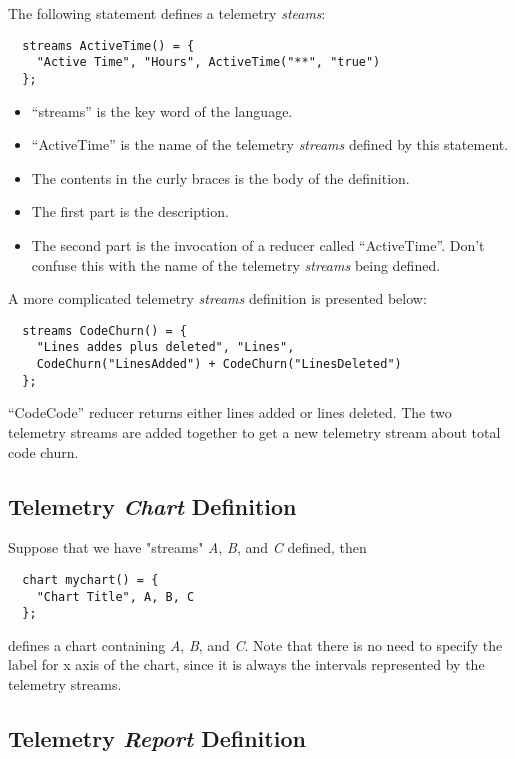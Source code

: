 The following statement defines a telemetry \textit{steams}:
\begin{verbatim}
  streams ActiveTime() = {
    "Active Time", "Hours", ActiveTime("**", "true")
  };
\end{verbatim}
\begin{itemize}
  \setlength{\itemsep}{0pt}
  \setlength{\parskip}{0pt}
	\item ``streams'' is the key word of the language.
  \item ``ActiveTime'' is the name of the telemetry \textit{streams} defined by this statement.
  \item The contents in the curly braces is the body of the definition.
  \item The first part is the description.
  \item The second part is the invocation of a reducer called ``ActiveTime''. Don't confuse  this with the name of the telemetry \textit{streams} being defined.
\end{itemize}
            

A more complicated telemetry \textit{streams} definition is presented below:
\begin{verbatim}
  streams CodeChurn() = { 
    "Lines addes plus deleted", "Lines",
    CodeChurn("LinesAdded") + CodeChurn("LinesDeleted")
  };
\end{verbatim}
``CodeCode'' reducer returns either lines added or lines deleted. The two telemetry streams are added together to get a new telemetry stream about total code churn.


        
                
\subsection{Telemetry \textit{Chart} Definition}

Suppose that we have "streams" \textit{A}, \textit{B}, and \textit{C} defined, then
\begin{verbatim}
  chart mychart() = {
    "Chart Title", A, B, C
  };
\end{verbatim}
defines a chart containing \textit{A}, \textit{B}, and \textit{C}. Note that there is no need to specify the label for x axis of the chart, since it is always the intervals represented by the telemetry streams.


                 
 
\subsection{Telemetry \textit{Report} Definition}

